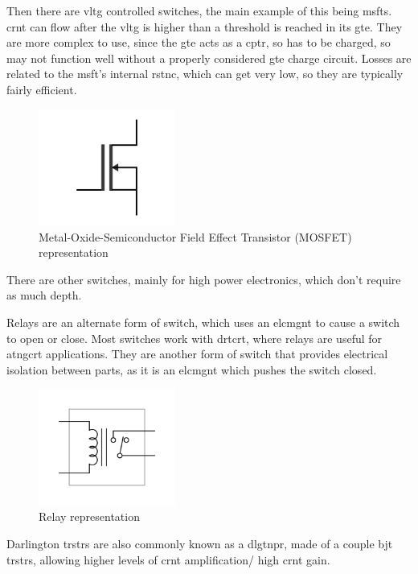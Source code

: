 \documentclass[a4paper,11pt]{report}
\begin{document}
Then there are \gls{vltg} controlled switches, the main example of this being \gls{msft}s. \gls{crnt} can flow after the \gls{vltg} is higher than a threshold is reached in its \gls{gte}. They are more complex to use, since the \gls{gte} acts as a \gls{cptr}, so has to be charged, so may not function well without a properly considered \gls{gte} charge circuit. Losses are related to the \gls{msft}'s internal \gls{rstnc}, which can get very low, so they are typically fairly efficient.

\begin{figure}[H]
\centering
\includegraphics[width=0.4\textwidth]{MOSFET}
\caption{Metal-Oxide-Semiconductor Field Effect Transistor (MOSFET) representation}
\end{figure}

There are other switches, mainly for high power electronics, which don't require as much depth.

Relays are an alternate form of switch, which uses an \gls{elcmgnt} to cause a switch to open or close. Most switches work with \gls{drtcrt}, where relays are useful for \gls{atngcrt} applications. They are another form of switch that provides electrical isolation between parts, as it is an \gls{elcmgnt} which pushes the switch closed.

\begin{figure}[H]
\centering
\includegraphics[width=0.4\textwidth]{relay}
\caption{Relay representation}
\end{figure}

Darlington \gls{trstr}s are also commonly known as a \gls{dlgtnpr}, made of a couple \gls{bjt} \gls{trstr}s, allowing higher levels of \gls{crnt} amplification/ high \gls{crnt} gain.
\end{document}

